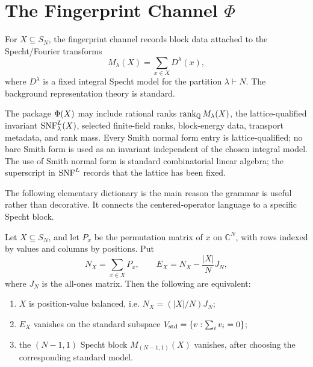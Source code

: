 \section{The Fingerprint Channel \texorpdfstring{\(\Phi\)}{Phi}}

For \(X\subseteq S_N\), the fingerprint channel records block data attached to the Specht/Fourier transforms
\[
  M_\lambda(X)=\sum_{x\in X}D^\lambda(x),
\]
where \(D^\lambda\) is a fixed integral Specht model for the partition \(\lambda\vdash N\).  The background representation theory is standard\cite{Diaconis1988,JamesKerber1981}.

\begin{definition}
The package \(\Phi(X)\) may include rational ranks \(\operatorname{rank}_\mathbb{Q} M_\lambda(X)\), the lattice-qualified invariant \(\operatorname{SNF}^{L}_\lambda(X)\), selected finite-field ranks, block-energy data, transport metadata, and rank mass.  Every Smith normal form entry is lattice-qualified; no bare Smith form is used as an invariant independent of the chosen integral model.  The use of Smith normal form is standard combinatorial linear algebra\cite{StanleySmithNormalForm2016}; the superscript in \(\operatorname{SNF}^{L}\) records that the lattice has been fixed.
\end{definition}

The following elementary dictionary is the main reason the grammar is useful rather than decorative.  It connects the centered-operator language to a specific Specht block.

\begin{proposition}\label{prop:standard-block-balance}
Let \(X\subseteq S_N\), and let \(P_x\) be the permutation matrix of \(x\) on \(\mathbb{C}^N\), with rows indexed by values and columns by positions.  Put
\[
  N_X=\sum_{x\in X}P_x,\qquad
  E_X=N_X-\frac{|X|}{N}J_N,
\]
where \(J_N\) is the all-ones matrix.  Then the following are equivalent:
\begin{enumerate}[label=\textup{(\alph*)},leftmargin=*]
  \item \(X\) is position-value balanced, i.e. \(N_X=(|X|/N)J_N\);
  \item \(E_X\) vanishes on the standard subspace \(V_{\mathrm{std}}=\{v:\sum_i v_i=0\}\);
  \item the \((N-1,1)\) Specht block \(M_{(N-1,1)}(X)\) vanishes, after choosing the corresponding standard model.
\end{enumerate}
\end{proposition}

